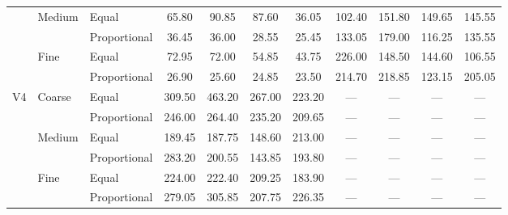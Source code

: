\documentclass[10pt,journal,cspaper,compsoc,onecolumn]{IEEEtran}
\begin{document}
\begin{table}[h]
\begin{tabular}{|c|l|l|c|c|c|c|c|c|c|c|}
		& Medium	& Equal					& 65.80	& 90.85	& 87.60	& 36.05	& 102.40	& 151.80	& 149.65	& 145.55	\\ \cline{3-11}
		&					& Proportional	& 36.45	& 36.00	& 28.55	& 25.45	& 133.05	& 179.00	& 116.25	& 135.55	\\ \cline{2-11}
		& Fine		& Equal					& 72.95	& 72.00	& 54.85	& 43.75	& 226.00	& 148.50	& 144.60	& 106.55	\\ \cline{3-11}
		&					& Proportional	& 26.90	& 25.60	& 24.85	& 23.50	& 214.70	& 218.85	& 123.15	& 205.05	\\ \hline
V4	& Coarse	& Equal					& 309.50	& 463.20	& 267.00	& 223.20	& ---	& ---	& ---	& ---	\\ \cline{3-11}
		&					& Proportional	& 246.00	& 264.40	& 235.20	& 209.65	& ---	& ---	& ---	& ---	\\ \cline{2-11}
		& Medium	& Equal					& 189.45	& 187.75	& 148.60	& 213.00	& ---	& ---	& ---	& ---	\\ \cline{3-11}
		&					& Proportional	& 283.20	& 200.55	& 143.85	& 193.80	& ---	& ---	& ---	& ---	\\ \cline{2-11}
		& Fine		& Equal					& 224.00	& 222.40	& 209.25	& 183.90	& ---	& ---	& ---	& ---	\\ \cline{3-11}
		&					& Proportional	& 279.05	& 305.85	& 207.75	& 226.35	& ---	& ---	& ---	& ---	\\ \hline
\end{tabular}
\end{table}
\end{document}
